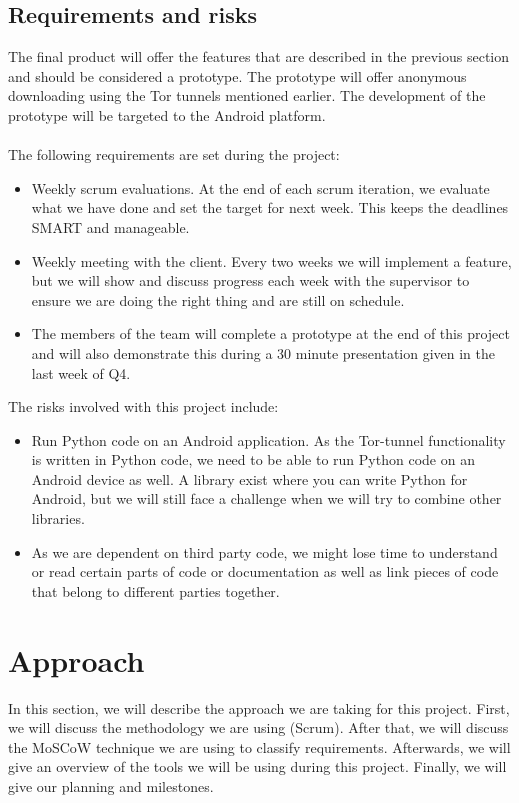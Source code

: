 \documentclass{article}
\begin{document}
\subsection{Requirements and risks}
The final product will offer the features that are described in the previous section and should be considered a prototype. The prototype will offer anonymous downloading using the Tor tunnels mentioned earlier. The development of the prototype will be targeted to the Android platform.\\\\
The following requirements are set during the project:

\begin{itemize}
\item Weekly scrum evaluations. At the end of each scrum iteration, we evaluate what we have done and set the target for next week. This keeps the deadlines SMART and manageable.
\item Weekly meeting with the client. Every two weeks we will implement a feature, but we will show and discuss progress each week with the supervisor to ensure we are doing the right thing and are still on schedule.
\item The members of the team will complete a prototype at the end of this project and will also demonstrate this during a 30 minute presentation given in the last week of Q4.
\end{itemize}

The risks involved with this project include:
\begin{itemize}
\item Run Python code on an Android application. As the Tor-tunnel functionality is written in Python code, we need to be able to run Python code on an Android device as well. A library exist where you can write Python for Android, but we will still face a challenge when we will try to combine other libraries.
\item As we are dependent on third party code, we might lose time to understand or read certain parts of code or documentation as well as link pieces of code that belong to different parties together.
\end{itemize}



\section{Approach}
In this section, we will describe the approach we are taking for this project. First, we will discuss the methodology we are using (Scrum). After that, we will discuss the MoSCoW technique we are using to classify requirements. Afterwards, we will give an overview of the tools we will be using during this project. Finally, we will give our planning and milestones.
\end{document}
